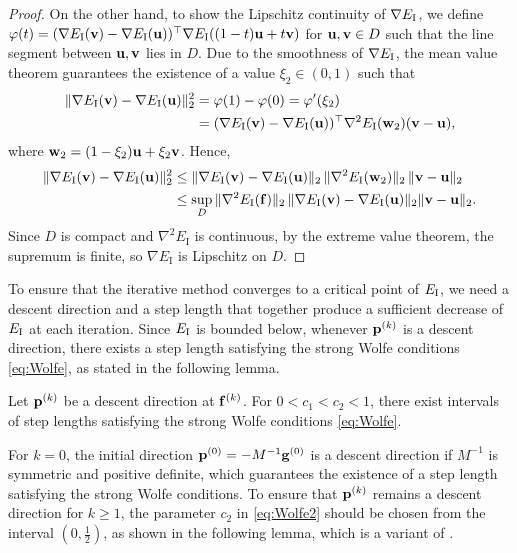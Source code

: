 \documentclass[11pt,a4paper]{article}
\begin{document}
\begin{proof}
On the other hand, to show the Lipschitz continuity of $\nabla E_{\mathrm{I}}$, we define $\varphi(t) = (\nabla E_{\mathrm{I}}(\mathbf{v}) - \nabla E_{\mathrm{I}}(\mathbf{u}))^\top \nabla E_{\mathrm{I}}((1-t)\mathbf{u} + t\mathbf{v})$ for $\mathbf{u},\mathbf{v}\in D$ such that the line segment between $\mathbf{u}, \mathbf{v}$ lies in $D$. Due to the smoothness of $\nabla E_{\mathrm{I}}$, the mean value theorem guarantees the existence of a value $\xi_2 \in(0,1)$ such that 
\begin{align*}
\|\nabla E_{\mathrm{I}}(\mathbf{v}) - \nabla E_{\mathrm{I}}(\mathbf{u})\|_2^2 
&= \varphi(1) - \varphi(0) = \varphi'(\xi_2) \\
&= (\nabla E_{\mathrm{I}}(\mathbf{v}) - \nabla E_{\mathrm{I}}(\mathbf{u}))^\top \nabla^2 E_{\mathrm{I}}(\mathbf{w}_2) (\mathbf{v} - \mathbf{u}),
\end{align*}
where $\mathbf{w}_2 = (1-\xi_2) \mathbf{u} + \xi_2 \mathbf{v}$. Hence,
\begin{align*}
\|\nabla E_{\mathrm{I}}(\mathbf{v}) - \nabla E_{\mathrm{I}}(\mathbf{u})\|_2^2 
&\leq  \|\nabla E_{\mathrm{I}}(\mathbf{v}) - \nabla E_{\mathrm{I}}(\mathbf{u}) \|_2  \,\|\nabla^2 E_{\mathrm{I}}(\mathbf{w}_2)\|_2  \,\|\mathbf{v} - \mathbf{u}\|_2\\
&\leq \sup_D \|\nabla^2 E_{\mathrm{I}}(\mathbf{f})\|_2 \, \|\nabla E_{\mathrm{I}}(\mathbf{v}) - \nabla E_{\mathrm{I}}(\mathbf{u}) \|_2 \|\mathbf{v} - \mathbf{u}\|_2.
\end{align*}
Since \(D\) is compact and \(\nabla^2 E_{\mathrm I}\) is continuous, by the extreme value theorem, the supremum is finite, so \(\nabla E_{\mathrm I}\) is Lipschitz on \(D\).
\end{proof}


To ensure that the iterative method converges to a critical point of $E_{\mathrm{I}}$, we need a descent direction and a step length that together produce a sufficient decrease of $E_{\mathrm{I}}$ at each iteration. 
Since $E_{\mathrm{I}}$ is bounded below, whenever $\mathbf{p}^{(k)}$ is a descent direction, there exists a step length satisfying the strong Wolfe conditions \eqref{eq:Wolfe}, as stated in the following lemma.


\begin{lemma}
\label{lma:Wolfe}
Let $\mathbf{p}^{(k)}$ be a descent direction at $\mathbf{f}^{(k)}$. For $0 < c_1 < c_2 < 1$, there exist intervals of step lengths satisfying the strong Wolfe conditions \eqref{eq:Wolfe}.
\end{lemma}


For $k = 0$, the initial direction $\mathbf{p}^{(0)} = - M^{-1} \mathbf{g}^{(0)}$ is a descent direction if $M^{-1}$ is symmetric and positive definite, which guarantees the existence of a step length satisfying the strong Wolfe conditions. 
To ensure that $\mathbf{p}^{(k)}$ remains a descent direction for $k \geq 1$, the parameter $c_2$ in \eqref{eq:Wolfe2} should be chosen from the interval $(0,\frac{1}{2})$, as shown in the following lemma, which is a variant of \cite[Lemma 5.6]{NoWr06}.
\end{document}
